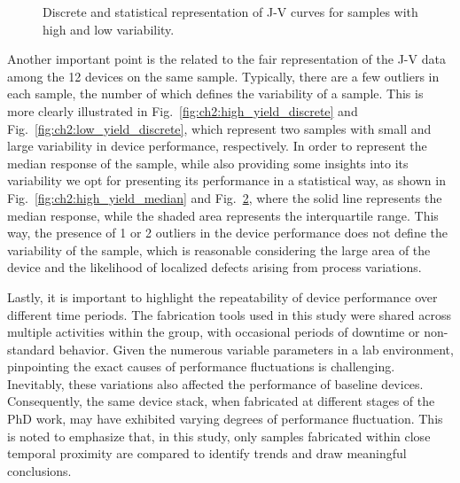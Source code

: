 \begin{figure}[htbp]
\begin{subfigure}[t]{0.4\textwidth}
        \caption{}
        \label{fig:ch2:low_yield_median}
    \end{subfigure}
    \caption{Discrete and statistical representation of J-V curves for samples with high and low variability.}
\end{figure}


Another important point is the related to the fair representation of the J-V data among the 12 devices on the same sample. Typically, there are a few outliers in each sample, the number of which defines the variability of a sample. This is more clearly illustrated in Fig.~\ref{fig:ch2:high_yield_discrete} and Fig.~\ref{fig:ch2:low_yield_discrete}, which represent two samples with small and large variability in device performance, respectively. In order to represent the median response of the sample, while also providing some insights into its variability we opt for presenting its performance in a statistical way, as shown in Fig.~\ref{fig:ch2:high_yield_median} and Fig.~\ref{fig:ch2:low_yield_median}, where the solid line represents the median response, while the shaded area represents the interquartile range. This way, the presence of 1 or 2 outliers in the device performance does not define the variability of the sample, which is reasonable considering the large area of the device and the likelihood of localized defects arising from process variations. 

Lastly, it is important to highlight the repeatability of device performance over different time periods. The fabrication tools used in this study were shared across multiple activities within the group, with occasional periods of downtime or non-standard behavior. Given the numerous variable parameters in a lab environment, pinpointing the exact causes of performance fluctuations is challenging. Inevitably, these variations also affected the performance of baseline devices. Consequently, the same device stack, when fabricated at different stages of the PhD work, may have exhibited varying degrees of performance fluctuation. This is noted to emphasize that, in this study, only samples fabricated within close temporal proximity are compared to identify trends and draw meaningful conclusions.




\cleardoublepage

